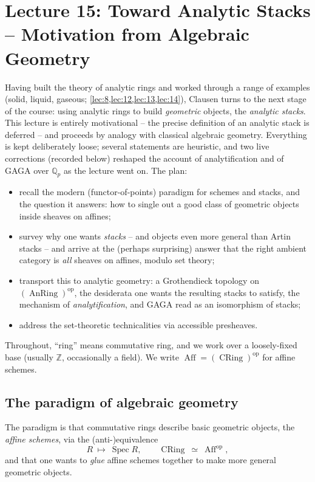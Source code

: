 \section{Lecture 15: Toward Analytic Stacks -- Motivation from Algebraic Geometry}
\label{lec:15}

Having built the theory of analytic rings and worked through a range of examples
(solid, liquid, gaseous; \cref{lec:8,lec:12,lec:13,lec:14}), Clausen turns to the
next stage of the course: using analytic rings to build \emph{geometric}
objects, the \emph{analytic stacks}. This lecture is entirely motivational -- the
precise definition of an analytic stack is deferred -- and proceeds by analogy
with classical algebraic geometry. Everything is kept deliberately loose; several
statements are heuristic, and two live corrections (recorded below) reshaped the
account of analytification and of GAGA over $\mathbb{Q}_p$ as the lecture went
on. The plan:
\begin{itemize}
\item recall the modern (functor-of-points) paradigm for schemes and stacks, and
the question it answers: how to single out a good class of geometric objects
inside sheaves on affines;
\item survey why one wants \emph{stacks} -- and objects even more general than
Artin stacks -- and arrive at the (perhaps surprising) answer that the right
ambient category is \emph{all} sheaves on affines, modulo set theory;
\item transport this to analytic geometry: a Grothendieck topology on
$(\operatorname{AnRing})^{\mathrm{op}}$, the desiderata one wants the resulting
stacks to satisfy, the mechanism of \emph{analytification}, and GAGA read as an
isomorphism of stacks;
\item address the set-theoretic technicalities via accessible presheaves.
\end{itemize}

Throughout, ``ring'' means commutative ring, and we work over a loosely-fixed base
(usually $\mathbb{Z}$, occasionally a field). We write $\operatorname{Aff} =
(\operatorname{CRing})^{\mathrm{op}}$ for affine schemes.

\subsection{The paradigm of algebraic geometry}

The paradigm is that commutative rings describe basic geometric objects, the
\emph{affine schemes}, via the (anti-)equivalence
\begin{equation*}
R\ \longmapsto\ \operatorname{Spec} R,\qquad \operatorname{CRing}\ \simeq\ \operatorname{Aff}^{\mathrm{op}},
\end{equation*}
and that one wants to \emph{glue} affine schemes together to make more general
geometric objects.

